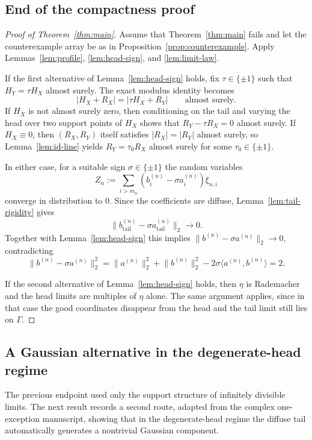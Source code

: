 \documentclass[11pt]{amsart}
\numberwithin{equation}{section}
\theoremstyle{definition}
\theoremstyle{remark}
\newcommand{\abs}[1]{\lvert #1 \rvert}
\newcommand{\norm}[1]{\lVert #1 \rVert}
\newcommand{\ip}[2]{\langle #1,#2\rangle}
\begin{document}
\subsection{End of the compactness proof}

\begin{proof}[Proof of Theorem~\ref{thm:main}]
Assume that Theorem~\ref{thm:main} fails and let the counterexample array be as
in Proposition~\ref{prop:counterexample}.  Apply
Lemmas~\ref{lem:profile}, \ref{lem:head-sign}, and \ref{lem:limit-law}.

If the first alternative of Lemma~\ref{lem:head-sign} holds, fix
$\tau\in\{\pm1\}$ such that $H_Y=\tau H_X$ almost surely.  The exact modulus
identity becomes
\[
\abs{H_X+R_X}=\abs{\tau H_X+R_Y}
\qquad\text{almost surely.}
\]
If $H_X$ is not almost surely zero, then conditioning on the tail and varying
the head over two support points of $H_X$ shows that
$R_Y-\tau R_X=0$ almost surely.  If $H_X\equiv0$, then
$(R_X,R_Y)$ itself satisfies $\abs{R_X}=\abs{R_Y}$ almost surely, so
Lemma~\ref{lem:id-line} yields
$R_Y=\tau_0 R_X$ almost surely for some $\tau_0\in\{\pm1\}$.

In either case, for a suitable sign $\sigma\in\{\pm1\}$ the random variables
\[
Z_n:=\sum_{i>m_n}(b_i^{(n)}-\sigma a_i^{(n)})\xi_{n,i}
\]
converge in distribution to $0$.  Since the coefficients are diffuse,
Lemma~\ref{lem:tail-rigidity} gives
\[
\norm{b_{\mathrm{tail}}^{(n)}-\sigma a_{\mathrm{tail}}^{(n)}}_2\to0.
\]
Together with Lemma~\ref{lem:head-sign} this implies
$\norm{b^{(n)}-\sigma a^{(n)}}_2\to0$, contradicting
\[
\norm{b^{(n)}-\sigma a^{(n)}}_2^2
=\norm{a^{(n)}}_2^2+\norm{b^{(n)}}_2^2
-2\sigma\ip{a^{(n)}}{b^{(n)}}=2.
\]

If the second alternative of Lemma~\ref{lem:head-sign} holds, then
$\eta$ is Rademacher and the head limits are multiples of $\eta$ alone.  The
same argument applies, since in that case the good coordinates disappear from
the head and the tail limit still lies on $\Gamma$.
\end{proof}

\subsection{A Gaussian alternative in the degenerate-head regime}

The previous endpoint used only the support structure of infinitely divisible
limits.  The next result records a second route, adapted from the complex
one-exception manuscript, showing that in the degenerate-head regime the
diffuse tail automatically generates a nontrivial Gaussian component.
\end{document}
